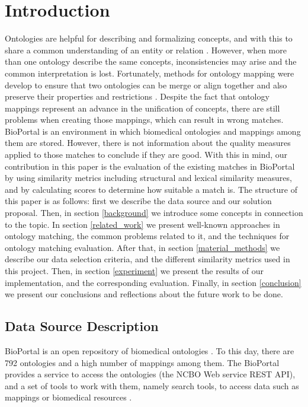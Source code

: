 \documentclass[runningheads]{llncs}
\begin{document}
\section{Introduction} \label{introduction}
Ontologies are helpful for describing and formalizing concepts, and with this to share a common understanding of an entity or relation \cite{Noy}. However, when more than one ontology describe the same concepts, inconsistencies may arise and the common interpretation is lost. Fortunately, methods for ontology mapping were develop to ensure that two ontologies can be merge or align together and also preserve their properties and restrictions \cite{Kalfoglou}. Despite the fact that ontology mappings represent an advance in the unification of concepts, there are still problems when creating those mappings, which can result in wrong matches. BioPortal is an environment in which biomedical ontologies and mappings among them are stored. However, there is not information about the quality measures applied to those matches to conclude if they are good. With this in mind, our contribution in this paper is the evaluation of the existing matches in BioPortal by using similarity metrics including structural and lexical similarity measures, and by calculating scores to determine how suitable a match is.
The structure of this paper is as follows: first we describe the data source and our solution proposal. Then, in section \ref{background} we introduce some concepts in connection to the topic. In section \ref{related_work} we present well-known approaches in ontology matching, the common problems related to it, and the techniques for ontology matching evaluation. After that, in section \ref{material_methods} we describe our data selection criteria, and the different similarity metrics used in this project. Then, in section \ref{experiment} we present the results of our implementation, and the corresponding evaluation. Finally, in section \ref{conclusion} we present our conclusions and reflections about the future work to be done.

\subsection{Data Source Description} \label{datasource}
BioPortal is an open repository of biomedical ontologies \cite{BioPortal}. To this day, there are 792 ontologies and a high number of mappings among them. The BioPortal provides a service to access the ontologies (the NCBO Web service REST API), and a set of tools to work with them, namely search tools, to access data such as mappings or biomedical resources \cite{ref_url1}. 
 
\end{document}
